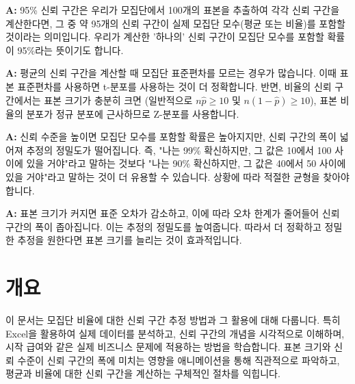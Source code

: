\documentclass[11pt,a4paper]{article}
\theoremstyle{definition}
\begin{document}
\begin{summarybox}[title=Q1: 95\% 신뢰 구간이 정확히 무엇을 의미하나요?]
\textbf{A:} 95\% 신뢰 구간은 우리가 모집단에서 100개의 표본을 추출하여 각각 신뢰 구간을 계산한다면, 그 중 약 95개의 신뢰 구간이 실제 모집단 모수(평균 또는 비율)를 포함할 것이라는 의미입니다. 우리가 계산한 '하나의' 신뢰 구간이 모집단 모수를 포함할 확률이 95\%라는 뜻이기도 합니다.
\end{summarybox}

\begin{infobox}[title=Q2: 왜 평균 신뢰 구간에서는 t-분포를 사용하고, 비율 신뢰 구간에서는 Z-분포를 사용하나요?]
\textbf{A:} 평균의 신뢰 구간을 계산할 때 모집단 표준편차를 모르는 경우가 많습니다. 이때 표본 표준편차를 사용하면 t-분포를 사용하는 것이 더 정확합니다. 반면, 비율의 신뢰 구간에서는 표본 크기가 충분히 크면 (일반적으로 $n\hat{p} \ge 10$ 및 $n(1-\hat{p}) \ge 10$), 표본 비율의 분포가 정규 분포에 근사하므로 Z-분포를 사용합니다.
\end{infobox}

\begin{importantbox}[title=Q3: 신뢰 수준을 높이면 항상 좋은 건가요?]
\textbf{A:} 신뢰 수준을 높이면 모집단 모수를 포함할 확률은 높아지지만, 신뢰 구간의 폭이 넓어져 추정의 정밀도가 떨어집니다. 즉, "나는 99\% 확신하지만, 그 값은 10에서 100 사이에 있을 거야"라고 말하는 것보다 "나는 90\% 확신하지만, 그 값은 40에서 50 사이에 있을 거야"라고 말하는 것이 더 유용할 수 있습니다. 상황에 따라 적절한 균형을 찾아야 합니다.
\end{importantbox}

\begin{warningbox}[title=Q4: 표본 크기가 신뢰 구간에 어떤 영향을 미치나요?]
\textbf{A:} 표본 크기가 커지면 표준 오차가 감소하고, 이에 따라 오차 한계가 줄어들어 신뢰 구간의 폭이 좁아집니다. 이는 추정의 정밀도를 높여줍니다. 따라서 더 정확하고 정밀한 추정을 원한다면 표본 크기를 늘리는 것이 효과적입니다.
\end{warningbox}

\newpage

\section{개요}
이 문서는 모집단 비율에 대한 신뢰 구간 추정 방법과 그 활용에 대해 다룹니다. 특히 Excel을 활용하여 실제 데이터를 분석하고, 신뢰 구간의 개념을 시각적으로 이해하며, 시작 급여와 같은 실제 비즈니스 문제에 적용하는 방법을 학습합니다. 표본 크기와 신뢰 수준이 신뢰 구간의 폭에 미치는 영향을 애니메이션을 통해 직관적으로 파악하고, 평균과 비율에 대한 신뢰 구간을 계산하는 구체적인 절차를 익힙니다.
\end{document}
